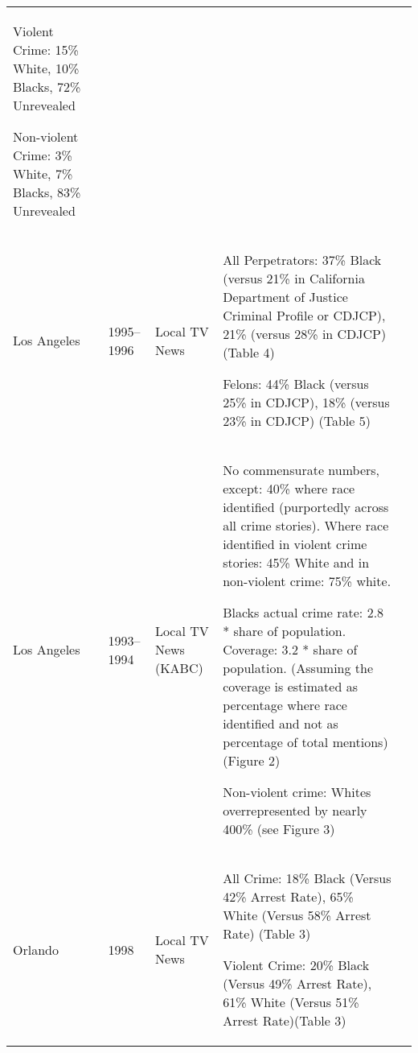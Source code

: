 \begin{table}[!htb]
\begin{tabular}{p{}p{}p{}p{}p{}}
Violent Crime: 15\% White,  10\% Blacks, 72\% Unrevealed 

Non-violent Crime: 3\% White,  7\% Blacks, 83\% Unrevealed & \citet{gross2006covering} \\ 
  Los Angeles & 1995--1996 & Local TV News & All Perpetrators: 37\% Black (versus 21\% in California Department of Justice Criminal Profile or CDJCP), 21\% (versus 28\% in CDJCP) (Table 4) 

Felons: 44\% Black (versus 25\% in CDJCP), 18\% (versus 23\% in CDJCP) (Table 5) & \citet{dixon2000overrepresentation} \\ 
  Los Angeles & 1993--1994 & Local TV News (KABC) & No commensurate numbers, except: 40\% where race identified (purportedly across all crime stories). Where race identified in violent crime stories: 45\% White and in non-violent crime: 75\% white. 

Blacks actual crime rate: 2.8 * share of population. Coverage: 3.2 * share of population. (Assuming the coverage is estimated as percentage where race identified and not as percentage of total mentions) (Figure 2) 

Non-violent crime: Whites overrepresented by nearly 400\% (see Figure 3) & \citet{gilliam1996crime} \\ 
  Orlando & 1998 & Local TV News & All Crime: 18\% Black (Versus 42\% Arrest Rate),  65\% White (Versus 58\% Arrest Rate) (Table  3)

Violent Crime: 20\% Black (Versus 49\% Arrest Rate), 61\% White (Versus 51\% Arrest Rate)(Table  3) & \citet{chiricos2002racial} \\ 
   \hline
\end{tabular}
\endgroup
\end{table}
